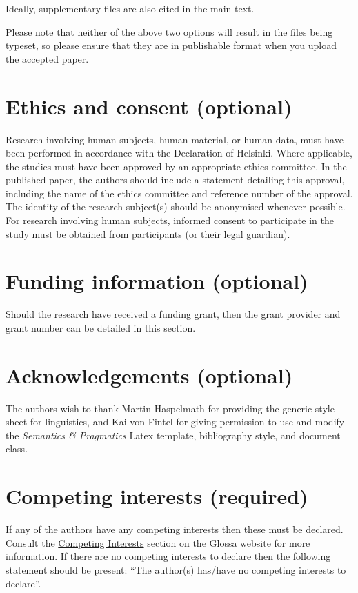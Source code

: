 \documentclass[charis,linguex]{glossa}
\begin{document}
Ideally, supplementary files are also cited in the main text. 

Please note that neither of the above two options will result in the files being typeset, so please ensure that they are in publishable format when you upload the accepted paper.


\section*{Ethics and consent (optional)}

Research involving human subjects, human material, or human data, must have been performed in accordance with the Declaration of Helsinki. Where applicable, the studies must have been approved by an appropriate ethics committee. In the published paper, the authors should include a statement detailing this approval, including the name of the ethics committee and reference number of the approval. The identity of the research subject(s) should be anonymised whenever possible. For research involving human subjects, informed consent to participate in the study must be obtained from participants (or their legal guardian).


\section*{Funding information (optional)}

Should the research have received a funding grant, then the grant provider and grant number can be detailed in this section. 

\section*{Acknowledgements (optional)}

The authors wish to thank Martin Haspelmath for providing the generic style sheet for linguistics, and Kai von Fintel for giving permission to use and modify the \textit{Semantics \& Pragmatics} Latex template, bibliography style, and document class.

\section*{Competing interests (required)}

If any of the authors have any competing interests then these must be declared. Consult the \href{https://www.glossa-journal.org/site/competing-interests/}{Competing Interests} section on the Glossa website for more information. If there are no competing interests to declare then the following statement should be present: ``The author(s) has/have no competing interests to declare''.
\end{document}
